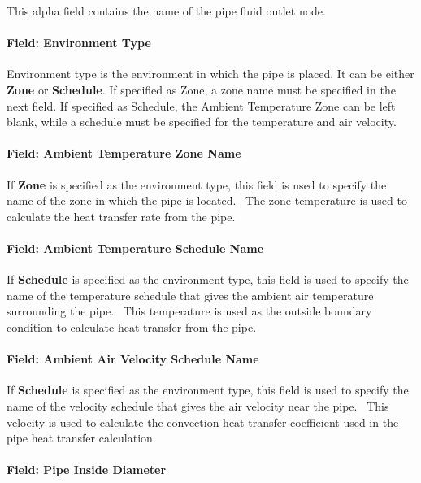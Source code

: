 This alpha field contains the name of the pipe fluid outlet node.

\paragraph{Field: Environment Type}\label{field-environment-type}

Environment type is the environment in which the pipe is placed. It can be either \textbf{Zone} or \textbf{Schedule}. If specified as Zone, a zone name must be specified in the next field. If specified as Schedule, the Ambient Temperature Zone can be left blank, while a schedule must be specified for the temperature and air velocity.

\paragraph{Field: Ambient Temperature Zone Name}\label{field-ambient-temperature-zone-name}

If \textbf{Zone} is specified as the environment type, this field is used to specify the name of the zone in which the pipe is located.~ The zone temperature is used to calculate the heat transfer rate from the pipe.

\paragraph{Field: Ambient Temperature Schedule Name}\label{field-ambient-temperature-schedule-name}

If \textbf{Schedule} is specified as the environment type, this field is used to specify the name of the temperature schedule that gives the ambient air temperature surrounding the pipe.~ This temperature is used as the outside boundary condition to calculate heat transfer from the pipe.

\paragraph{Field: Ambient Air Velocity Schedule Name}\label{field-ambient-air-velocity-schedule-name}

If \textbf{Schedule} is specified as the environment type, this field is used to specify the name of the velocity schedule that gives the air velocity near the pipe.~ This velocity is used to calculate the convection heat transfer coefficient used in the pipe heat transfer calculation.

\paragraph{Field: Pipe Inside Diameter}\label{field-pipe-inside-diameter-000}

